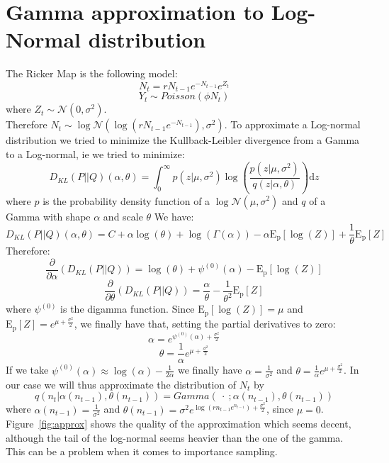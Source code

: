 \documentclass{article}
\begin{document}
\section*{Gamma approximation to Log-Normal distribution}
The Ricker Map is the following model:
\begin{equation*}
N_t = rN_{t-1}e^{-N_{t-1}}e^{Z_t}
\end{equation*}
\begin{equation*}
Y_t \sim Poisson(\phi N_t)
\end{equation*}
where $Z_t \sim \mathcal{N} (0,\sigma^2)$.\\
Therefore $N_t \sim \log\mathcal{N} (\log{(rN_{t-1}e^{-N_{t-1}})},\sigma^2)$. To approximate a Log-normal distribution we tried to minimize the Kullback-Leibler divergence from a Gamma to a Log-normal, ie we tried to minimize:
\begin{equation*}
D_{KL}(P||Q)(\alpha, \theta) = \int_{0}^{\infty}{p(z|\mu, \sigma^2)\log(\frac{p(z|\mu, \sigma^2)}{q(z|\alpha, \theta)})\mathrm{d}z}
\end{equation*}
where $p$ is the probability density function of a $\log\mathcal{N}(\mu, \sigma^2)$ and $q$ of a Gamma with shape $\alpha$ and scale $\theta$
We have:
\begin{equation*}
D_{KL}(P||Q)(\alpha, \theta) = C + \alpha\log(\theta) + \log(\Gamma(\alpha)) - \alpha\mathrm{E_p}[\log(Z)] + \frac{1}{\theta}\mathrm{E_p}[Z]
\end{equation*}
Therefore:
\begin{equation*}
\frac{\partial }{\partial \alpha}(D_{KL}(P||Q)) = \log(\theta) + \psi^{(0)}(\alpha)-\mathrm{E_p}[\log(Z)]
\end{equation*}
\begin{equation*}
\frac{\partial }{\partial \theta}(D_{KL}(P||Q)) = \frac{\alpha}{\theta} - \frac{1}{\theta^2}\mathrm{E_p}[Z]
\end{equation*}
where $\psi^{(0)}$ is the digamma function.
\clearpage
Since $\mathrm{E_p}[\log(Z)]=\mu$ and $\mathrm{E_p}[Z] = e^{\mu+\frac{\sigma^2}{2}}$, we finally have that, setting the partial derivatives to zero:
\begin{equation*}
\alpha=e^{\psi^{(0)}(\alpha)+\frac{\sigma^2}{2}}
\end{equation*}
\begin{equation*}
\theta=\frac{1}{\alpha}e^{\mu+\frac{\sigma^2}{2}}
\end{equation*}
If we take $\psi^{(0)}(\alpha) \approx \log(\alpha)-\frac{1}{2\alpha}$ we finally have $\alpha =\frac{1}{\sigma^2}$ and $\theta=\frac{1}{\alpha}e^{\mu+\frac{\sigma^2}{2}}$.
In our case we will thus approximate the distribution of $N_t$ by
\begin{equation*}
q(n_t|\alpha(n_{t-1}), \theta(n_{t-1})) = Gamma(\ \cdot \ ; \alpha(n_{t-1}), \theta(n_{t-1}) )
\end{equation*}
where $ \alpha(n_{t-1})= \frac{1}{\sigma^2}$ and $\theta(n_{t-1})=\sigma^2e^{\log(rn_{t-1}e^{n_{t-1}})+\frac{\sigma^2}{2}}$, since $\mu = 0$.\\
Figure~\ref{fig:approx} shows the quality of the approximation which seems decent, although the tail of the log-normal seems heavier than the one of the gamma. This can be a problem when it comes to importance sampling.
\end{document}
